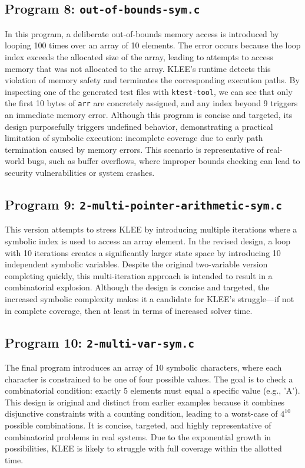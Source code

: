 \documentclass[conference]{IEEEtran}
\begin{document}
\subsection{Program 8: \texttt{out-of-bounds-sym.c}}
In this program, a deliberate out-of-bounds memory access is introduced by looping 100 times over an array of 10 elements. The error occurs because the loop index exceeds the allocated size of the array, leading to attempts to access memory that was not allocated to the array. KLEE’s runtime detects this violation of memory safety and terminates the corresponding execution paths. By inspecting one of the generated test files with \texttt{ktest-tool}, we can see that only the first 10 bytes of \texttt{arr} are concretely assigned, and any index beyond 9 triggers an immediate memory error. Although this program is concise and targeted, its design purposefully triggers undefined behavior, demonstrating a practical limitation of symbolic execution: incomplete coverage due to early path termination caused by memory errors. This scenario is representative of real-world bugs, such as buffer overflows, where improper bounds checking can lead to security vulnerabilities or system crashes.

\subsection{Program 9: \texttt{2-multi-pointer-arithmetic-sym.c}}
This version attempts to stress KLEE by introducing multiple iterations where a symbolic index is used to access an array element. In the revised design, a loop with 10 iterations creates a significantly larger state space by introducing 10 independent symbolic variables. Despite the original two-variable version completing quickly, this multi-iteration approach is intended to result in a combinatorial explosion. Although the design is concise and targeted, the increased symbolic complexity makes it a candidate for KLEE’s struggle—if not in complete coverage, then at least in terms of increased solver time.

\subsection{Program 10: \texttt{2-multi-var-sym.c}}
The final program introduces an array of 10 symbolic characters, where each character is constrained to be one of four possible values. The goal is to check a combinatorial condition: exactly 5 elements must equal a specific value (e.g., 'A'). This design is original and distinct from earlier examples because it combines disjunctive constraints with a counting condition, leading to a worst-case of $4^{10}$ possible combinations. It is concise, targeted, and highly representative of combinatorial problems in real systems. Due to the exponential growth in possibilities, KLEE is likely to struggle with full coverage within the allotted time.
\end{document}
